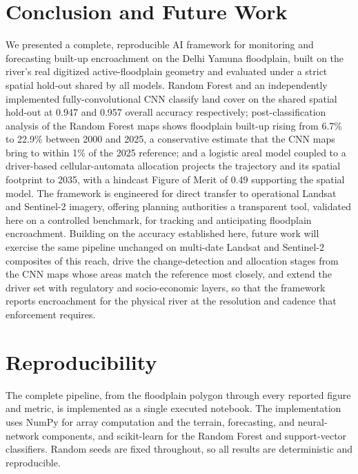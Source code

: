 \documentclass[journal]{IEEEtran}
\begin{document}
\section{Conclusion and Future Work}\label{sec:conclusion}
We presented a complete, reproducible AI framework for monitoring and forecasting built-up encroachment on the Delhi Yamuna floodplain, built on the river's real digitized active-floodplain geometry and evaluated under a strict spatial hold-out shared by all models. Random Forest and an independently implemented fully-convolutional CNN classify land cover on the shared spatial hold-out at 0.947 and 0.957 overall accuracy respectively; post-classification analysis of the Random Forest maps shows floodplain built-up rising from 6.7\% to 22.9\% between 2000 and 2025, a conservative estimate that the CNN maps bring to within 1\% of the 2025 reference; and a logistic areal model coupled to a driver-based cellular-automata allocation projects the trajectory and its spatial footprint to 2035, with a hindcast Figure of Merit of 0.49 supporting the spatial model. The framework is engineered for direct transfer to operational Landsat and Sentinel-2 imagery, offering planning authorities a transparent tool, validated here on a controlled benchmark, for tracking and anticipating floodplain encroachment. Building on the accuracy established here, future work will exercise the same pipeline unchanged on multi-date Landsat and Sentinel-2 composites of this reach, drive the change-detection and allocation stages from the CNN maps whose areas match the reference most closely, and extend the driver set with regulatory and socio-economic layers, so that the framework reports encroachment for the physical river at the resolution and cadence that enforcement requires.

\section*{Reproducibility}
The complete pipeline, from the floodplain polygon through every reported figure and metric, is implemented as a single executed notebook. The implementation uses NumPy \cite{harris2020array} for array computation and the terrain, forecasting, and neural-network components, and scikit-learn \cite{pedregosa2011scikit} for the Random Forest and support-vector classifiers. Random seeds are fixed throughout, so all results are deterministic and reproducible.



\end{document}
